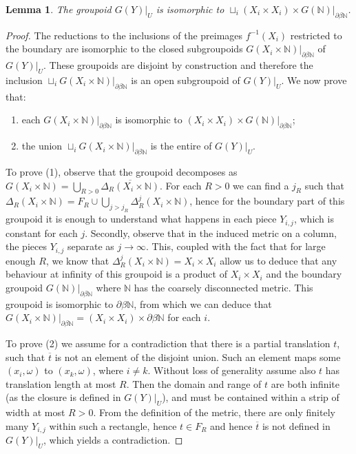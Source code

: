 \documentclass[11pt]{amsart}
\theoremstyle{plain}
\newtheorem{lemma}[theorem]{Lemma}%
\theoremstyle{definition}%
\theoremstyle{remark}%
\begin{document}
\begin{lemma}\label{Lem:CE3}
The groupoid $G(Y)|_{U}$ is isomorphic to $\sqcup_{i}(X_{i}\times X_{i})\times G(\mathbb{N})|_{\partial\beta \mathbb{N}}$.
\end{lemma}
\begin{proof}
The reductions to the inclusions of the preimages $f^{-1}(X_{i})$ restricted to the boundary are isomorphic to the closed subgroupoids $G(X_{i}\times \mathbb{N})|_{\partial\beta \mathbb{N}}$ of $G(Y)|_{U}$. These groupoids are disjoint by construction and therefore the inclusion $\sqcup_{i}G(X_{i}\times \mathbb{N})|_{\partial\beta \mathbb{N}}$ is an open subgroupoid of $G(Y)|_{U}$. We now prove that:
\begin{enumerate}
\item each $G(X_{i} \times \mathbb{N})|_{\partial\beta \mathbb{N}}$ is isomorphic to $(X_{i}\times X_{i})\times G(\mathbb{N})|_{\partial\beta \mathbb{N}}$;
\item the union $\sqcup_{i}G(X_{i}\times \mathbb{N})|_{\partial\beta \mathbb{N}}$ is the entire of $G(Y)|_{U}$.
\end{enumerate}
To prove (1), observe that the groupoid decomposes as $G(X_{i}\times \mathbb{N}) = \bigcup_{R>0}\overline{\Delta_{R}(X_{i}\times \mathbb{N})}$. For each $R>0$ we can find a $j_{R}$ such that $\Delta_{R}(X_{i}\times \mathbb{N}) = F_{R} \cup \bigcup_{j>j_{R}}\Delta_{R}^{j}(X_{i}\times \mathbb{N})$, hence for the boundary part of this groupoid it is enough to understand what happens in each piece $Y_{i,j}$, which is constant for each $j$. Secondly, observe that in the induced metric on a column, the pieces $Y_{i,j}$ separate as $j\rightarrow \infty$. This, coupled with the fact that for large enough $R$, we know that $ \Delta^{j}_{R}(X_{i}\times \mathbb{N}) = X_{i} \times X_{i}$ allow us to deduce that any behaviour at infinity of this groupoid is a product of $X_{i} \times X_{i}$ and the boundary groupoid $G(\mathbb{N})|_{\partial\beta \mathbb{N}}$ where $\mathbb{N}$ has the coarsely disconnected metric. This groupoid is isomorphic to $\partial\beta \mathbb{N}$, from which we can deduce that $G(X_{i}\times \mathbb{N})|_{\partial\beta \mathbb{N}} = (X_{i}\times X_{i})\times \partial\beta \mathbb{N}$ for each $i$.

To prove (2) we assume for a contradiction that there is a partial translation $t$, such that $\overline{t}$ is not an element of the disjoint union. Such an element maps some $(x_{i}, \omega)$ to $(x_{k},\omega)$, where $i\not =k$. Without loss of generality assume also $t$ has translation length at most $R$. Then the domain and range of $t$ are both infinite (as the closure is defined in $G(Y)|_{U}$), and must be contained within a strip of width at most $R>0$. From the definition of the metric, there are only finitely many $Y_{i,j}$ within such a rectangle, hence $t \in F_{R}$ and hence $\overline{t}$ is not defined in $G(Y)|_{U}$, which yields a contradiction.
\end{proof}
\end{document}
